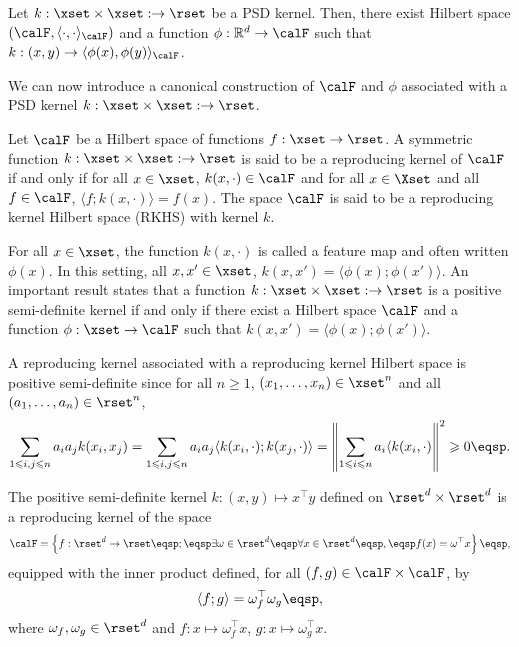 \begin{shaded}
\begin{theorem}
Let  $k:\xset\times\xset:\to \rset$ be a PSD kernel. Then, there exist Hilbert space $(\calF, \langle \cdot,\cdot\rangle_\calF)$ and a function $\phi: \mathbb{R}^d\to \calF$ such that $k:(x,y) \to \langle \phi(x),\phi(y)\rangle_\calF$.
\end{theorem}
\end{shaded}

We can now introduce a canonical construction of $\calF$ and $\phi$ associated with a PSD kernel $k:\xset\times\xset:\to \rset$.

\begin{shaded}
\begin{definition}
Let $\calF$ be a Hilbert space of functions $f:\xset\to\rset$. A symmetric function $k:\xset\times\xset:\to \rset$ is said to be a reproducing kernel of $\calF$ if and only if for all $x\in\xset$, $k(x,\cdot)\in\calF$ and for all $x\in\Xset$ and all $f\in\calF$, $\langle f; k(x,\cdot)\rangle = f(x)$. The space $\calF$ is said to be a reproducing kernel Hilbert space (RKHS) with kernel $k$.
\end{definition}
\end{shaded}

\begin{remark}
For all $x\in\xset$, the function $k(x,\cdot)$ is called a feature map and often written $\phi(x)$. In this setting, all $x,x'\in\xset$, $k(x,x') = \langle \phi(x); \phi(x')\rangle$. An important result states that  a function $k:\xset\times\xset:\to \rset$ is a positive semi-definite kernel if and only if there exist a Hilbert space $\calF$ and a function $\phi: \xset\to \calF$ such that $k(x,x') = \langle \phi(x); \phi(x')\rangle$.
\end{remark}

A reproducing kernel associated with a reproducing kernel Hilbert space is positive semi-definite since for all $n\geqslant 1$, $(x_1,\ldots,x_n)\in\xset^n$ and all $(a_1,\ldots,a_n)\in\rset^n$,
\[
\sum_{1\leqslant i,j\leqslant n}a_ia_jk(x_i,x_j) = \sum_{1\leqslant i,j\leqslant n}a_ia_j \langle k(x_i,\cdot);k(x_j,\cdot)\rangle = \left\|\sum_{1\leqslant i\leqslant n}a_i\langle k(x_i,\cdot)\right\|^2 \geqslant 0\eqsp.
\]

\begin{remark}
The positive semi-definite kernel $k:(x,y)\mapsto x^\top y$ defined on $\rset^d\times\rset^d$ is a reproducing kernel of the space
$$
\calF = \left\{f: \rset^d\to\rset\eqsp;\eqsp \exists \omega\in\rset^d \eqsp\forall x\in \rset^d\eqsp, \eqsp f(x) = \omega^\top x\right\}\eqsp,
$$
equipped with the inner product defined, for all $(f,g)\in\calF\times\calF$, by 
$$
\langle f; g\rangle = \omega_f^\top \omega_g\eqsp, 
$$
where $\omega_f,\omega_g\in\rset^d$ and $f: x\mapsto \omega_f^\top x$, $g: x\mapsto \omega_g^\top x$. 
\end{remark}

